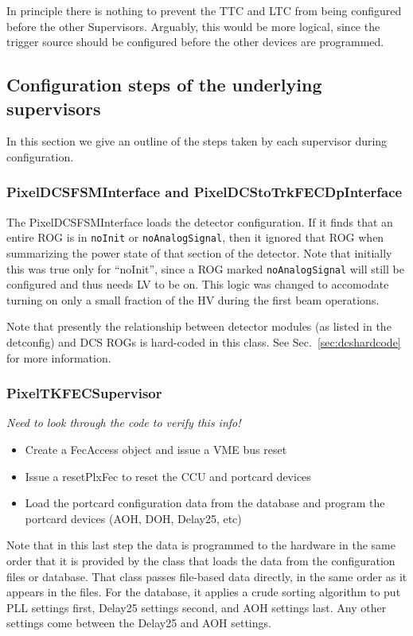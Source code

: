 In principle there is nothing to prevent the TTC and LTC from being
configured before the other Supervisors. Arguably, this would be more logical, since the trigger source
should be configured before the other devices are programmed.

\subsection{Configuration steps of the underlying supervisors}
In this section we give an outline of the steps taken by each supervisor during configuration.

\subsubsection{PixelDCSFSMInterface and PixelDCStoTrkFECDpInterface}

The PixelDCSFSMInterface loads the detector configuration. If it finds
that an entire ROG is in {\tt noInit} or {\tt noAnalogSignal}, then it
ignored that ROG when summarizing the power state of that section of
the detector. Note that initially this was true only for ``noInit'',
since a ROG marked {\tt noAnalogSignal} will still be configured and
thus needs LV to be on. This logic was changed to accomodate turning
on only a small fraction of the HV during the first beam operations.

Note that presently the relationship between detector modules (as
listed in the detconfig) and DCS ROGs is hard-coded in this class. See
Sec.~\ref{sec:dcshardcode} for more information.

\subsubsection{PixelTKFECSupervisor}

{\it Need to look through the code to verify this info!}
\begin{itemize}
\item Create a FecAccess object and issue a VME bus reset
\item Issue a resetPlxFec to reset the CCU and portcard devices
\item Load the portcard configuration data from the database and program the portcard devices (AOH, DOH, Delay25, etc)
\end{itemize}

Note that in this last step the data is programmed to the hardware in
the same order that it is provided by the class that loads the data
from the configuration files or database. That class passes file-based
data directly, in the same order as it appears in the files. For the
database, it applies a crude sorting algorithm to put PLL settings
first, Delay25 settings second, and AOH settings last. Any other
settings come between the Delay25 and AOH settings.

